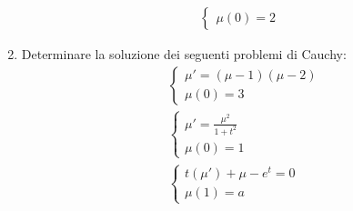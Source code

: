 \begin{enumerate}
\begin{align*}
\begin{cases}
			      \mu \left(0\right) = 2
		      \end{cases}
	      \end{align*}
	\item Determinare la soluzione dei seguenti problemi di Cauchy:
	      \begin{align*}
		       &
		      \begin{cases}
			      \mu ' = \left(\mu -1\right)\left( \mu -2\right) \\
			      \mu \left(0\right) = 3
		      \end{cases}
		      \\
		       &
		      \begin{cases}
			      \mu ' = \frac{\mu ^2 }{1 + t^2 } \\
			      \mu  \left(0\right) = 1
		      \end{cases}
		      \\
		       &
		      \begin{cases}
			      t\left(\mu '\right) + \mu  - e^{t} = 0 \\
			      \mu \left(1\right) = a
		      \end{cases}
	      \end{align*}
\end{enumerate}
